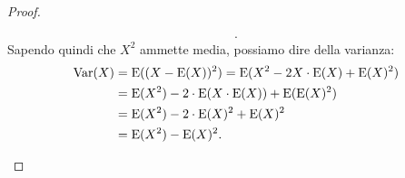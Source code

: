 \begin{proof}
\begin{enumerate}
\begin{align*}
                .\end{align*}
                Sapendo quindi che $X^2$ ammette media, possiamo dire della varianza:
                \begin{align*}
                    \text{Var}(X) &= \text{E}((X - \text{E}(X))^2) = \text{E}(X^2 - 2X\cdot\text{E}(X) + \text{E}(X)^2) \\
                                  &= \text{E}(X^2) - 2\cdot\text{E}(X\cdot\text{E}(X)) + \text{E}(\text{E}(X)^2) \\
                                  &= \text{E}(X^2) - 2\cdot\text{E}(X)^2 + \text{E}(X)^2 \\
                                  &= \text{E}(X^2) - \text{E}(X)^2 \qedhere
                .\end{align*}
            \end{enumerate}
        \end{proof}
